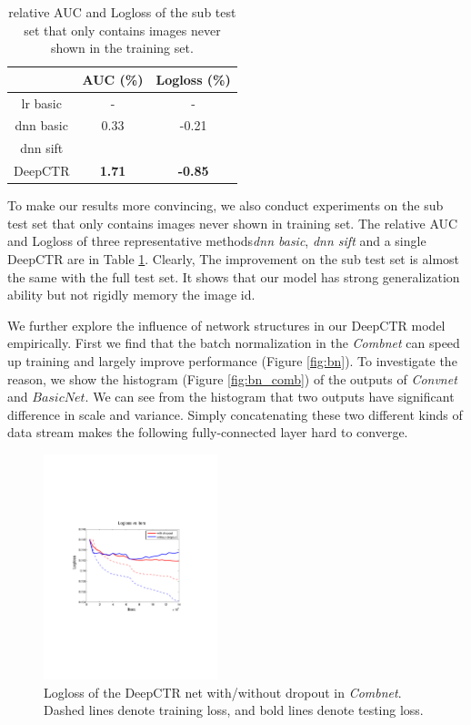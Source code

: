 \documentclass{sig-alternate}
\begin{document}
\begin{table}
	\centering
	\caption{relative AUC and Logloss of the sub test set that only contains images never shown in the training set.}
	\label{table:subset}
	\begin{tabular}{|c|c|c|} \hline
		 & AUC (\%) & Logloss (\%)\\ \hline
		lr basic & - & - \\ \hline
		dnn basic & 0.33 & -0.21 \\ \hline
		dnn sift &  &  \\ \hline
		DeepCTR & \textbf{1.71} & \textbf{-0.85} \\ \hline
	\end{tabular}
\end{table}
To make our results more convincing, we also conduct experiments on the sub test set that only contains images never shown in training set. The relative AUC and Logloss of three representative methods\emph{dnn basic}, \emph{dnn sift} and a single DeepCTR are in Table \ref{table:subset}. Clearly, The improvement on the sub test set is almost the same with the full test set. It shows that our model has strong generalization ability but not rigidly memory the image id.   

We further  explore the influence of network structures in our DeepCTR model empirically. First we find that the batch normalization in the \emph{Combnet} can speed up training and largely improve performance (Figure \ref{fig:bn}). To investigate the reason, we show the histogram (Figure \ref{fig:bn_comb}) of the outputs of \emph{Convnet} and $BasicNet$. We can see from the histogram  that two outputs have significant difference in scale and variance. Simply concatenating  these two different kinds of data stream  makes the following fully-connected layer hard to converge. 
\begin{figure}
	\centering
	\includegraphics[width=0.45\textwidth]{dropout_test_train}
	\caption{Logloss of the DeepCTR net with/without dropout in \emph{Combnet}. Dashed lines denote training loss, and bold lines denote testing loss.}
	\label{fig:dropout}
\end{figure}
\end{document}
